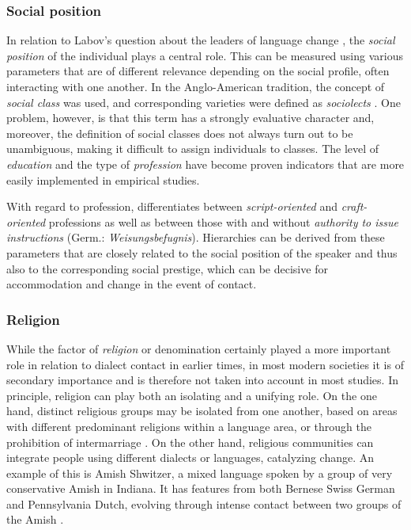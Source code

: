 \documentclass[output=paper]{langscibook}
\begin{document}
\subsubsection{Social position}

In relation to Labov’s \parencite*{Labov2001} question about the leaders of language change , the \textit{social position} of the individual plays a central role. This can be measured using various parameters that are of different relevance depending on the social profile, often interacting with one another. In the Anglo-American tradition, the concept of \textit{social class} was used, and corresponding varieties were defined as \textit{sociolects} \parencite[190]{Dittmar1997}. One problem, however, is that this term has a strongly evaluative character and, moreover, the definition of social classes does not always turn out to be unambiguous, making it difficult to assign individuals to classes. The level of \textit{education} and the type of \textit{profession} have become proven indicators that are more easily implemented in empirical studies. 

With regard to profession, \citet{Mattheier1994} differentiates between \textit{script-ori\-en\-ted} and \textit{craft-oriented} professions as well as between those with and without \textit{authority to issue instructions} (Germ.: \textit{Weisungsbefugnis}). Hierarchies can be derived from these parameters that are closely related to the social position of the speaker and thus also to the corresponding social prestige, which can be decisive for accommodation and change in the event of contact.

\subsubsection{Religion}

While the factor of \textit{religion} or denomination certainly played a more important role in relation to dialect contact in earlier times, in most modern societies it is of secondary importance and is therefore not taken into account in most studies. In principle, religion can play both an isolating and a unifying role. On the one hand, distinct religious groups may be isolated from one another, based on areas with different predominant religions within a language area, or through the prohibition of intermarriage \parencite[e.g.,][]{BucheliBerger2014}. On the other hand, religious communities can integrate people using different dialects or languages, catalyzing change. An example of this is Amish Shwitzer, a mixed language spoken by a group of very conservative Amish in Indiana. It has features from both Bernese Swiss German and Pennsylvania Dutch, evolving through intense contact between two groups of the Amish \parencite{hasse_in_press}.
\end{document}
